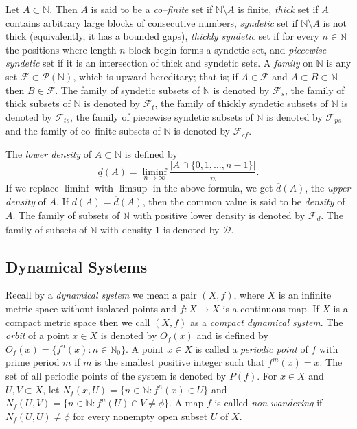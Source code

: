 \documentclass{amsart}[12pt, papera4]
\theoremstyle{definition}
\theoremstyle{remark}
\numberwithin{equation}{section}
\def\N{{\mathbb N}}
\def\F{{\mathscr{F}}}
\begin{document}
\noindent Let $A \subset \mathbb{N}$. Then $A$ is said to be a
\emph{co--finite} set if $\mathbb{N}\setminus A$ is finite,
\emph{thick} set if $A$ contains arbitrary large blocks of consecutive numbers,
\emph{syndetic} set if $\mathbb{N}\setminus A$ is not thick (equivalently, it has a bounded gaps),
\emph{thickly  syndetic} set if for every $n\in \mathbb{N}$ the positions where length $n$ block begin forms a syndetic set, and
\emph{piecewise syndetic} set if it is an intersection of thick and syndetic sets. 
\noindent A \emph{family} on $\mathbb{N}$ is any set $\mathscr{F}\subset \mathscr{P}(\mathbb{N})$, which is upward hereditary; that is; if $A\in \mathscr{F}$ and $A\subset B\subset \mathbb{N}$ then $B\in \mathscr{F}$. The family of syndetic subsets of $\N$ is denoted by $\mathscr{F}_s$, the family of thick subsets of $\N$ is denoted by $\mathscr{F}_t$, the family of thickly syndetic subsets of $\N$ is denoted by $\mathscr{F}_{ts}$, the family of piecewise syndetic subsets of $\N$ is denoted by $\mathscr{F}_{ps}$ and the family of co--finite subsets of $\N$ is denoted by $\mathscr{F}_{cf}$.

\noindent The \emph{lower density} of $A\subset \N$ is defined by $$\underline{d}(A)=\liminf_{n\to \infty}\frac{|A\cap\{0,1,\dots,n-1\}|}{n}.$$ If we replace $\liminf$ with $\limsup$ in the above formula, we get $\overline{d}(A)$, the \emph{upper density} of $A$. If $\underline{d}(A)=\overline{d}(A)$, then the common value is said to be \emph{density} of $A$. The family of subsets of $\N$ with positive lower density is denoted by $\F_{\underline{d}}$. The family of subsets of $\N$ with density $1$ is denoted by $\mathscr{D}$.

\subsection{Dynamical Systems}

\noindent Recall by a \emph{dynamical system} we mean a pair $(X,f)$, where $X$ is an infinite metric space without isolated points and $f:X\longrightarrow X$ is a continuous map.  If $X$ is a compact metric space then we call $(X,f)$ as a \emph{compact dynamical system}. The \emph{orbit} of a point $x \in X$ is denoted by $O_f(x)$ and is defined by $O_f(x)=\{f^n(x):n \in \mathbb{N}_0\}.$  A point $x\in X$ is called a  \emph{periodic  point} of $f$ with prime period $m$ if $m$  is the smallest positive integer such that $f^ m(x)=x$. The set of all periodic points of the system is denoted by $P(f)$. For $x\in X$ and $U, V\subset X$, let $N_f(x,U)=\{n\in \mathbb{N}:f^n(x)\in U\}$ and $N_f(U,V)=\{n\in \mathbb{N}:f^n(U)\cap V\neq \phi\}$. A map $f$ is called \emph{non-wandering} if $N_f(U,U)\neq \phi$ for every nonempty open subset $U$ of $X$. 
\end{document}
